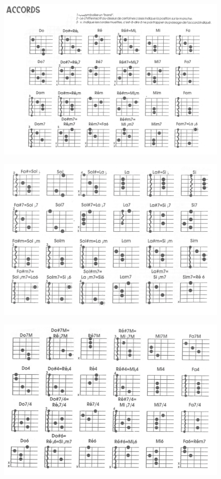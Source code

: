 \documentclass[9pt]{article}
\begin{document}
\begin{figure}[ht!]
    \centering
    \includegraphics[width=.95\linewidth]{photos_accords/accords_1.png}
\end{figure}
\begin{figure}[ht!]
    \centering
    \includegraphics[width=.95\linewidth]{photos_accords/accords_2.png}
\end{figure}
\begin{figure}[ht!]
    \centering
    \includegraphics[width=.95\linewidth]{photos_accords/accords_3.png}
\end{figure}
\end{document}
